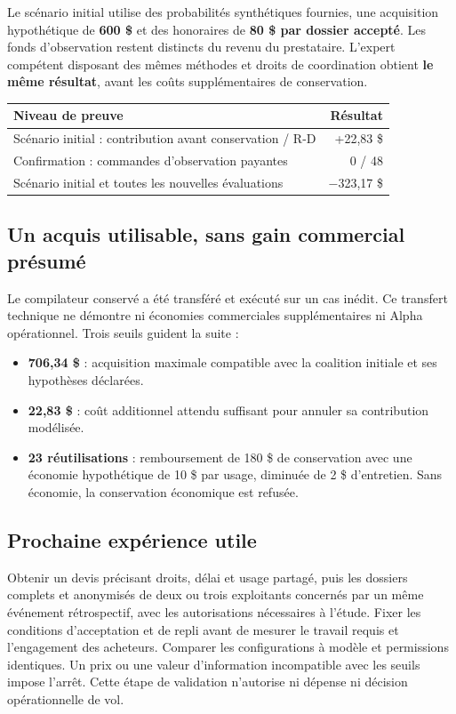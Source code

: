 \documentclass[10pt,letterpaper]{article}
\providecommand{\tightlist}{\setlength{\itemsep}{0pt}\setlength{\parskip}{0pt}}
\begin{document}
Le scénario initial utilise des probabilités synthétiques fournies, une
acquisition hypothétique de \textbf{600 \$} et des honoraires de
\textbf{80 \$ par dossier accepté}. Les fonds d'observation restent
distincts du revenu du prestataire. L'expert compétent disposant des
mêmes méthodes et droits de coordination obtient \textbf{le même
résultat}, avant les coûts supplémentaires de conservation.

\begin{longtable}[]{@{}lr@{}}
\toprule\noalign{}
Niveau de preuve & Résultat \\
\midrule\noalign{}
\endhead
\bottomrule\noalign{}
\endlastfoot
Scénario initial : contribution avant conservation / R-D & +22,83 \$ \\
Confirmation : commandes d'observation payantes & 0 / 48 \\
Scénario initial et toutes les nouvelles évaluations & −323,17 \$ \\
\end{longtable}

\hypertarget{un-acquis-utilisable-sans-gain-commercial-pruxe9sumuxe9}{%
\subsection{Un acquis utilisable, sans gain commercial
présumé}\label{un-acquis-utilisable-sans-gain-commercial-pruxe9sumuxe9}}

Le compilateur conservé a été transféré et exécuté sur un cas inédit. Ce
transfert technique ne démontre ni économies commerciales
supplémentaires ni Alpha opérationnel. Trois seuils guident la suite :

\begin{itemize}
\tightlist
\item
  \textbf{706,34 \$} : acquisition maximale compatible avec la coalition
  initiale et ses hypothèses déclarées.
\item
  \textbf{22,83 \$} : coût additionnel attendu suffisant pour annuler sa
  contribution modélisée.
\item
  \textbf{23 réutilisations} : remboursement de 180 \$ de conservation
  avec une économie hypothétique de 10 \$ par usage, diminuée de 2 \$
  d'entretien. Sans économie, la conservation économique est refusée.
\end{itemize}

\hypertarget{prochaine-expuxe9rience-utile}{%
\subsection{Prochaine expérience
utile}\label{prochaine-expuxe9rience-utile}}

Obtenir un devis précisant droits, délai et usage partagé, puis les
dossiers complets et anonymisés de deux ou trois exploitants concernés
par un même événement rétrospectif, avec les autorisations nécessaires à
l'étude. Fixer les conditions d'acceptation et de repli avant de mesurer
le travail requis et l'engagement des acheteurs. Comparer les
configurations à modèle et permissions identiques. Un prix ou une valeur
d'information incompatible avec les seuils impose l'arrêt. Cette étape
de validation n'autorise ni dépense ni décision opérationnelle de vol.
\end{document}
